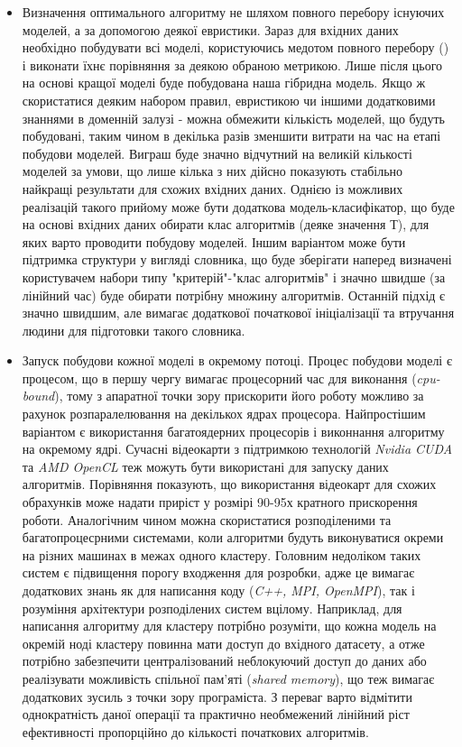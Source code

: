 \begin{itemize}
	\item Визначення оптимального алгоритму не шляхом повного перебору існуючих моделей, а за допомогою деякої евристики. Зараз для вхідних даних необхідно побудувати всі моделі, користуючись медотом повного перебору () і виконати їхнє порівняння за деякою обраною метрикою. Лише після цього на основі кращої моделі буде побудована наша гібридна модель. Якщо ж скористатися деяким набором правил, евристикою чи іншими додатковими знаннями в доменній залузі - можна обмежити кількість моделей, що будуть побудовані, таким чином в декілька разів зменшити витрати на час на етапі побудови моделей. Виграш буде значно відчутний на великій кількості моделей за умови, що лише кілька з них дійсно показують стабільно найкращі результати для схожих вхідних даних. Однією із можливих реалізацій такого прийому може бути додаткова модель-класифікатор, що буде на основі вхідних даних обирати клас алгоритмів (деяке значення Т), для яких варто проводити побудову моделей. Іншим варіантом може бути підтримка структури у вигляді словника, що буде зберігати наперед визначені користувачем набори типу "критерій"-"клас алгоритмів" і значно швидше (за лінійний час) буде обирати потрібну множину алгоритмів. Останній підхід є значно швидшим, але вимагає додаткової початкової ініціалізації та втручання людини для підготовки такого словника.
	\item Запуск побудови кожної моделі в окремому потоці. Процес побудови моделі є процесом, що в першу чергу вимагає процесорний час для виконання (\textit{cpu-bound}), тому з апаратної точки зору прискорити його роботу можливо за рахунок розпаралелювання на декількох ядрах процесора. Найпростішим варіантом є використання багатоядерних процесорів і виконнання алгоритму на окремому ядрі. Сучасні відеокарти з підтримкою технологій \textit{Nvidia CUDA} та \textit{AMD OpenCL} теж можуть бути використані для запуску даних алгоритмів. Порівняння показують, що використання відеокарт для схожих обрахунків може надати приріст у розмірі 90-95х кратного прискорення роботи. Аналогічним чином можна скористатися розподіленими та багатопроцесрними системами, коли алгоритми будуть виконуватися окреми на різних машинах в межах одного кластеру. Головним недоліком таких систем є підвищення порогу входження для розробки, адже це вимагає додаткових знань як для написання коду (\textit{C++, MPI, OpenMPI}), так і розуміння архітектури розподілених систем вцілому. Наприклад, для написання алгоритму для кластеру потрібно розуміти, що кожна модель на окремій ноді кластеру повинна мати доступ до вхідного датасету, а отже потрібно забезпечити централізований неблокуючий доступ до даних або реалізувати можливість спільної пам'яті (\textit{shared memory}), що теж вимагає додаткових зусиль з точки зору програміста. З переваг варто відмітити однократність даної операції та практично необмежений лінійний ріст ефективності пропорційно до кількості початкових алгоритмів.

\end{itemize}
